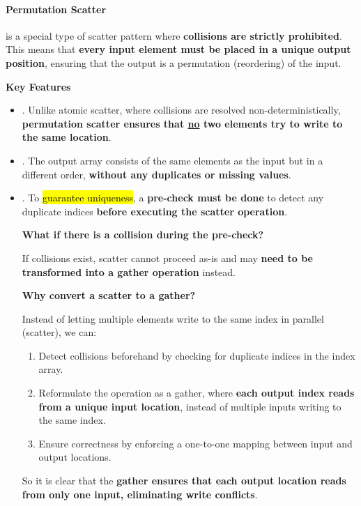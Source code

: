 \paragraph{Permutation Scatter}

 is a special type of scatter pattern where \textbf{collisions are strictly prohibited}. This means that \textbf{every input element must be placed in a unique output position}, ensuring that the output is a permutation (reordering) of the input.

\highspace
\begin{flushleft}
    \textcolor{Green3}{ \textbf{Key Features}}
\end{flushleft}
\begin{itemize}
    \item {}. Unlike atomic scatter, where collisions are resolved non-deterministically, \textbf{permutation scatter ensures that \underline{no} two elements try to write to the same location}.
    \item {}. The output array consists of the same elements as the input but in a different order, \textbf{without any duplicates or missing values}.
    \item {}. To \hl{guarantee uniqueness}, a \textbf{pre-check must be done} to detect any duplicate indices \textbf{before executing the scatter operation}.
    
    \highspace
    \begin{flushleft}
        \textcolor{Red2}{ \textbf{What if there is a collision during the pre-check?}}
    \end{flushleft}
    If collisions exist, scatter cannot proceed as-is and may \textbf{need to be transformed into a gather operation} instead.

    \highspace
    \begin{flushleft}
        \textcolor{Green3}{ \textbf{Why convert a scatter to a gather?}}
    \end{flushleft}
    Instead of letting multiple elements write to the same index in parallel (scatter), we can:
    \begin{enumerate}
        \item Detect collisions beforehand by checking for duplicate indices in the index array.
        \item Reformulate the operation as a gather, where \textbf{each output index reads from a unique input location}, instead of multiple inputs writing to the same index.
        \item Ensure correctness by enforcing a one-to-one mapping between input and output locations.
    \end{enumerate}
    So it is clear that the \textbf{gather ensures that each output location reads from only one input, eliminating write conflicts}.


\end{itemize}
